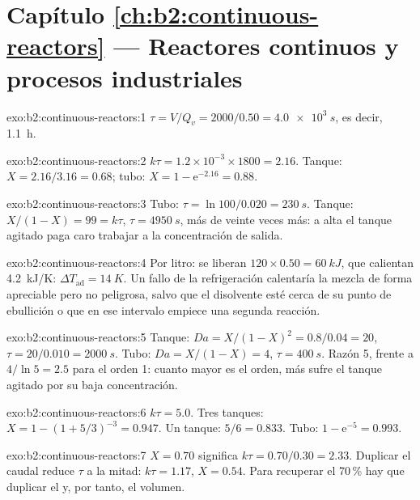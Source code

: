 \section*{Capítulo \ref{ch:b2:continuous-reactors} --- Reactores continuos y procesos industriales}

\begin{solution}{exo:b2:continuous-reactors:1}
$\tau = V/Q_v = 2000/0.50 = \qty{4.0e3}{s}$, es decir, \qty{1.1}{h}.
\end{solution}

\begin{solution}{exo:b2:continuous-reactors:2}
$k\tau = 1.2 \times 10^{-3} \times 1800 = 2.16$. Tanque: $X = 2.16/3.16 = 0.68$;
tubo: $X = 1 - \mathrm e^{-2.16} = 0.88$.
\end{solution}

\begin{solution}{exo:b2:continuous-reactors:3}
Tubo: $\tau = \ln 100/0.020 = \qty{230}{s}$. Tanque: $X/(1 - X) = 99 = k\tau$,
$\tau = \qty{4950}{s}$, más de veinte veces más: a  alta el
tanque agitado paga caro trabajar a la concentración de salida.
\end{solution}

\begin{solution}{exo:b2:continuous-reactors:4}
Por litro: se liberan $120 \times 0.50 = \qty{60}{kJ}$, que calientan
\qty{4.2}{kJ/K}: $\Delta T_{\text{ad}} = \qty{14}{K}$. Un fallo de la refrigeración
calentaría la mezcla de forma apreciable pero no peligrosa, salvo que el disolvente esté
cerca de su punto de ebullición o que en ese intervalo empiece una segunda reacción.
\end{solution}

\begin{solution}{exo:b2:continuous-reactors:5}
Tanque: $Da = X/(1 - X)^2 = 0.8/0.04 = 20$, $\tau = 20/0.010 = \qty{2000}{s}$.
Tubo: $Da = X/(1 - X) = 4$, $\tau = \qty{400}{s}$. Razón 5, frente a $4/\ln 5 =
2.5$ para el orden 1: cuanto mayor es el orden, más sufre el tanque agitado
por su baja concentración.
\end{solution}

\begin{solution}{exo:b2:continuous-reactors:6}
$k\tau = 5.0$. Tres tanques: $X = 1 - (1 + 5/3)^{-3} = 0.947$. Un tanque: $5/6 =
0.833$. Tubo: $1 - \mathrm e^{-5} = 0.993$.
\end{solution}

\begin{solution}{exo:b2:continuous-reactors:7}
$X = 0.70$ significa $k\tau = 0.70/0.30 = 2.33$. Duplicar el caudal reduce $\tau$ a la mitad:
$k\tau = 1.17$, $X = 0.54$. Para recuperar el 70\,\% hay que duplicar el  y,
por tanto, el volumen.
\end{solution}

